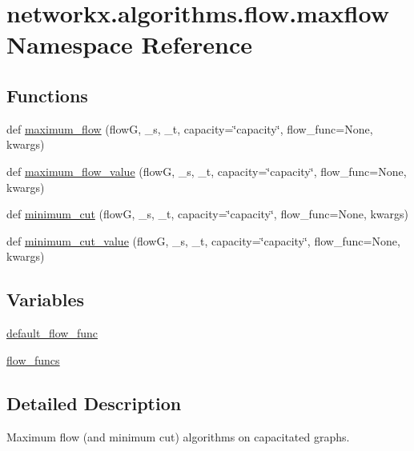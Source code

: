 \hypertarget{namespacenetworkx_1_1algorithms_1_1flow_1_1maxflow}{}\section{networkx.\+algorithms.\+flow.\+maxflow Namespace Reference}
\label{namespacenetworkx_1_1algorithms_1_1flow_1_1maxflow}
\subsection*{Functions}
\begin{DoxyCompactItemize}
\item 
def \hyperlink{namespacenetworkx_1_1algorithms_1_1flow_1_1maxflow_a66e4d2007ca288b02e49846a4a25994c}{maximum\+\_\+flow} (flowG, \+\_\+s, \+\_\+t, capacity=\char`\"{}capacity\char`\"{}, flow\+\_\+func=None, kwargs)
\item 
def \hyperlink{namespacenetworkx_1_1algorithms_1_1flow_1_1maxflow_a1a1661c7cb34faa8bbe10d57cfc3ab3c}{maximum\+\_\+flow\+\_\+value} (flowG, \+\_\+s, \+\_\+t, capacity=\char`\"{}capacity\char`\"{}, flow\+\_\+func=None, kwargs)
\item 
def \hyperlink{namespacenetworkx_1_1algorithms_1_1flow_1_1maxflow_a2b42167cf296bb43dbd57f17926db3fc}{minimum\+\_\+cut} (flowG, \+\_\+s, \+\_\+t, capacity=\char`\"{}capacity\char`\"{}, flow\+\_\+func=None, kwargs)
\item 
def \hyperlink{namespacenetworkx_1_1algorithms_1_1flow_1_1maxflow_a5a92d8e8d9389ce5daed1068317f5b5b}{minimum\+\_\+cut\+\_\+value} (flowG, \+\_\+s, \+\_\+t, capacity=\char`\"{}capacity\char`\"{}, flow\+\_\+func=None, kwargs)
\end{DoxyCompactItemize}
\subsection*{Variables}
\begin{DoxyCompactItemize}
\item 
\hyperlink{namespacenetworkx_1_1algorithms_1_1flow_1_1maxflow_a857a2f8be172db71de98b250db0394fa}{default\+\_\+flow\+\_\+func}
\item 
\hyperlink{namespacenetworkx_1_1algorithms_1_1flow_1_1maxflow_a5243b2ab0dc59ea61b7a11730e419299}{flow\+\_\+funcs}
\end{DoxyCompactItemize}


\subsection{Detailed Description}
\begin{DoxyVerb}Maximum flow (and minimum cut) algorithms on capacitated graphs.
\end{DoxyVerb}
 


